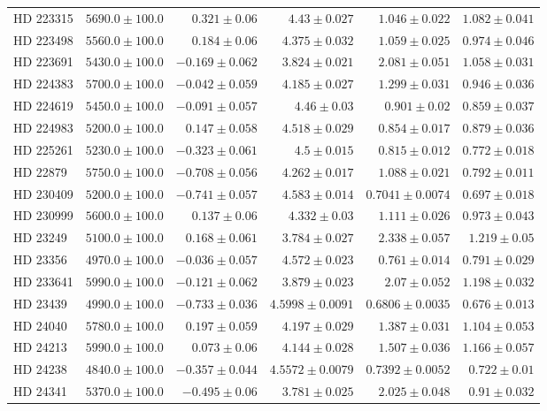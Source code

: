 \begin{longtable*}{lrrrrr}
HD 223315 & $5690.0\pm 100.0$ & $0.321\pm 0.06$ & $4.43\pm 0.027$ & $1.046\pm 0.022$ & $1.082\pm 0.041$ \\ 
HD 223498 & $5560.0\pm 100.0$ & $0.184\pm 0.06$ & $4.375\pm 0.032$ & $1.059\pm 0.025$ & $0.974\pm 0.046$ \\ 
HD 223691 & $5430.0\pm 100.0$ & $-0.169\pm 0.062$ & $3.824\pm 0.021$ & $2.081\pm 0.051$ & $1.058\pm 0.031$ \\ 
HD 224383 & $5700.0\pm 100.0$ & $-0.042\pm 0.059$ & $4.185\pm 0.027$ & $1.299\pm 0.031$ & $0.946\pm 0.036$ \\ 
HD 224619 & $5450.0\pm 100.0$ & $-0.091\pm 0.057$ & $4.46\pm 0.03$ & $0.901\pm 0.02$ & $0.859\pm 0.037$ \\ 
HD 224983 & $5200.0\pm 100.0$ & $0.147\pm 0.058$ & $4.518\pm 0.029$ & $0.854\pm 0.017$ & $0.879\pm 0.036$ \\ 
HD 225261 & $5230.0\pm 100.0$ & $-0.323\pm 0.061$ & $4.5\pm 0.015$ & $0.815\pm 0.012$ & $0.772\pm 0.018$ \\ 
HD 22879 & $5750.0\pm 100.0$ & $-0.708\pm 0.056$ & $4.262\pm 0.017$ & $1.088\pm 0.021$ & $0.792\pm 0.011$ \\ 
HD 230409 & $5200.0\pm 100.0$ & $-0.741\pm 0.057$ & $4.583\pm 0.014$ & $0.7041\pm 0.0074$ & $0.697\pm 0.018$ \\ 
HD 230999 & $5600.0\pm 100.0$ & $0.137\pm 0.06$ & $4.332\pm 0.03$ & $1.111\pm 0.026$ & $0.973\pm 0.043$ \\ 
HD 23249 & $5100.0\pm 100.0$ & $0.168\pm 0.061$ & $3.784\pm 0.027$ & $2.338\pm 0.057$ & $1.219\pm 0.05$ \\ 
HD 23356 & $4970.0\pm 100.0$ & $-0.036\pm 0.057$ & $4.572\pm 0.023$ & $0.761\pm 0.014$ & $0.791\pm 0.029$ \\ 
HD 233641 & $5990.0\pm 100.0$ & $-0.121\pm 0.062$ & $3.879\pm 0.023$ & $2.07\pm 0.052$ & $1.198\pm 0.032$ \\ 
HD 23439 & $4990.0\pm 100.0$ & $-0.733\pm 0.036$ & $4.5998\pm 0.0091$ & $0.6806\pm 0.0035$ & $0.676\pm 0.013$ \\ 
HD 24040 & $5780.0\pm 100.0$ & $0.197\pm 0.059$ & $4.197\pm 0.029$ & $1.387\pm 0.031$ & $1.104\pm 0.053$ \\ 
HD 24213 & $5990.0\pm 100.0$ & $0.073\pm 0.06$ & $4.144\pm 0.028$ & $1.507\pm 0.036$ & $1.166\pm 0.057$ \\ 
HD 24238 & $4840.0\pm 100.0$ & $-0.357\pm 0.044$ & $4.5572\pm 0.0079$ & $0.7392\pm 0.0052$ & $0.722\pm 0.01$ \\ 
HD 24341 & $5370.0\pm 100.0$ & $-0.495\pm 0.06$ & $3.781\pm 0.025$ & $2.025\pm 0.048$ & $0.91\pm 0.032$ \\ 

\end{longtable*}
